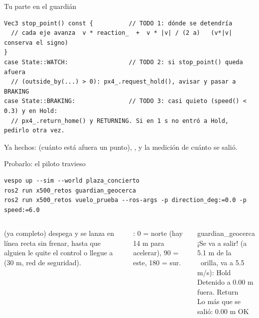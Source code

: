 \begin{frame}[fragile]{Tu parte en el guardián}
  \begin{lstlisting}[style=cpp,caption={guardian\_geocerca: los tres TODO}]
Vec3 stop_point() const {          // TODO 1: dónde se detendría
  // cada eje avanza  v * reaction_  +  v * |v| / (2 a)   (v*|v| conserva el signo)
}
case State::WATCH:                 // TODO 2: si stop_point() queda afuera
  // (outside_by(...) > 0): px4_.request_hold(), avisar y pasar a BRAKING
case State::BRAKING:               // TODO 3: casi quieto (speed() < 0.3) y en Hold:
  // px4_.return_home() y RETURNING. Si en 1 s no entró a Hold, pedirlo otra vez.
  \end{lstlisting}
  \small Ya hechos:  (cuánto está afuera un punto), ,
   y la medición de cuánto se salió.
\end{frame}

\begin{frame}[fragile]{Probarlo: el piloto travieso}
  \begin{lstlisting}[style=bash,caption={Tres terminales}]
vespo up --sim --world plaza_concierto
ros2 run x500_retos guardian_geocerca
ros2 run x500_retos vuelo_prueba --ros-args -p direction_deg:=0.0 -p speed:=6.0
  \end{lstlisting}
  \begin{columns}[c]
    \small
     (ya completo) despega y se lanza en línea recta sin frenar, hasta que
    alguien le quite el control o llegue a  (30 m, red de seguridad).
    \vspace{0.3em}

    : 0 = norte (hay 14 m para acelerar), 90 = este, 180 = sur.
    \begin{terminal}{guardian\_geocerca}
¡Se va a salir! (a 5.1 m de la\\
\ orilla, va a 5.5 m/s): Hold\\
Detenido a 0.00 m fuera. Return\\
Lo más que se salió: 0.00 m OK
    \end{terminal}
  \end{columns}
\end{frame}

